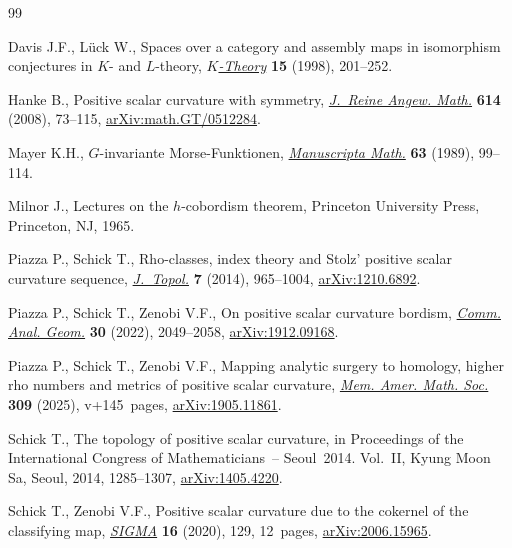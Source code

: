 \documentclass[pdftex]{sigma}
\numberwithin{equation}{section}
\begin{document}
\begin{thebibliography}{99}
\footnotesize\itemsep=0pt

Davis J.F., L\"uck W., Spaces over a category and assembly maps in isomorphism
 conjectures in {$K$}- and {$L$}-theory,
 \href{https://doi.org/10.1023/A:1007784106877}{\textit{$K$-Theory}}
 \textbf{15} (1998), 201--252.

Hanke B., Positive scalar curvature with symmetry,
 \href{https://doi.org/10.1515/CRELLE.2008.003}{\textit{J.~Reine Angew.
 Math.}} \textbf{614} (2008), 73--115,
 \href{http://arxiv.org/abs/math.GT/0512284}{arXiv:math.GT/0512284}.

Mayer K.H., {$G$}-invariante {M}orse-{F}unktionen,
 \href{https://doi.org/10.1007/BF01173705}{\textit{Manuscripta Math.}}
 \textbf{63} (1989), 99--114.

Milnor J., Lectures on the {$h$}-cobordism theorem, Princeton University Press,
 Princeton, NJ, 1965.

Piazza P., Schick T., Rho-classes, index theory and {S}tolz' positive scalar
 curvature sequence,
 \href{https://doi.org/10.1112/jtopol/jtt048}{\textit{J.~Topol.}} \textbf{7}
 (2014), 965--1004, \href{http://arxiv.org/abs/1210.6892}{arXiv:1210.6892}.

Piazza P., Schick T., Zenobi V.F., On positive scalar curvature bordism,
 \href{https://doi.org/10.4310/cag.2022.v30.n9.a4}{\textit{Comm. Anal. Geom.}}
 \textbf{30} (2022), 2049--2058,
 \href{http://arxiv.org/abs/1912.09168}{arXiv:1912.09168}.

Piazza P., Schick T., Zenobi V.F., Mapping analytic surgery to homology, higher
 rho numbers and metrics of positive scalar curvature,
 \href{https://doi.org/10.1090/memo/1562}{\textit{Mem. Amer. Math. Soc.}}
 \textbf{309} (2025), v+145~pages,
 \href{http://arxiv.org/abs/1905.11861}{arXiv:1905.11861}.

Schick T., The topology of positive scalar curvature, in Proceedings of the
 {I}nternational {C}ongress of {M}athematicians~-- {S}eoul~2014. {V}ol.~{II},
 Kyung Moon Sa, Seoul, 2014, 1285--1307,
 \href{http://arxiv.org/abs/1405.4220}{arXiv:1405.4220}.

Schick T., Zenobi V.F., Positive scalar curvature due to the cokernel of the
 classifying map,
 \href{https://doi.org/10.3842/SIGMA.2020.129}{\textit{SIGMA}} \textbf{16}
 (2020), 129, 12~pages,
 \href{http://arxiv.org/abs/2006.15965}{arXiv:2006.15965}.


\end{thebibliography}
\end{document}
